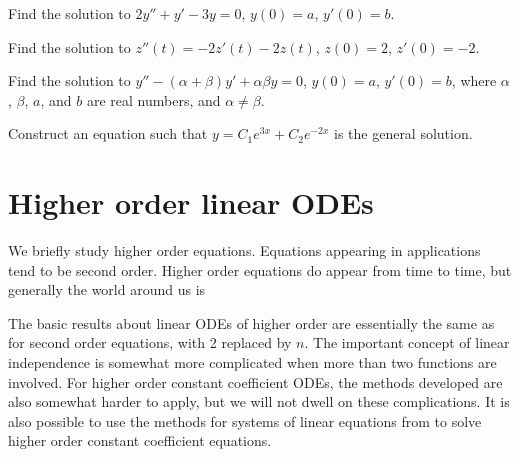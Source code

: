 \begin{exercise}
Find the solution to
$2y''+y'-3y=0$, $y(0) = a$, $y'(0)=b$.
\end{exercise}

\begin{exercise}
Find the solution to
$z''(t) = -2z'(t)-2z(t)$, $z(0) = 2$, $z'(0)= -2$.
\end{exercise}

\begin{exercise}
Find the solution to
$y''-(\alpha+\beta) y' + \alpha \beta y=0$, $y(0) = a$, $y'(0)=b$,
where $\alpha$, $\beta$, $a$, and $b$ are real numbers, and $\alpha \not=
\beta$.
\end{exercise}

\begin{exercise}
Construct an equation such that $y = C_1 e^{3x} + C_2 e^{-2x}$ is the general
solution.
\end{exercise}


\sectionnewpage
\section{Higher order linear ODEs} \label{sec:hol}


%

We briefly study higher order equations.
Equations appearing in applications tend to be second
order.  Higher order equations do appear from time to time, but
generally the world around us is   

The basic results about linear ODEs of higher order are essentially 
the same as for second order equations, with 2 replaced by $n$.
The important concept
of linear independence is somewhat more complicated when more than two
functions are involved.
For higher order constant coefficient ODEs, the methods developed are also
somewhat harder to apply,
but we will not dwell on these complications.
It is also possible to use the methods for systems
of linear equations from  to solve higher order
constant coefficient equations.

